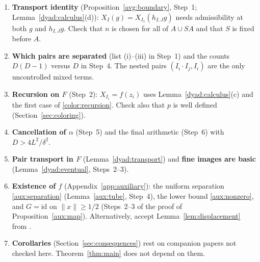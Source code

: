 \documentclass[11pt]{article}
\newcommand{\norm}[1]{\lVert #1\rVert}
\theoremstyle{definition}
\numberwithin{equation}{section}
\begin{document}
\begin{enumerate}
\item \textbf{Transport identity} (Proposition~\ref{avg:boundary}, Step~1;
 Lemma~\ref{dyad:calculus}(d)): $X_I(g)=X_{I_1}(h_{I,J}g)$ needs
 admissibility at both $g$ and $h_{I,J}g$. Check that $n$ is chosen for all
 of $A\cup SA$ and that $S$ is fixed before $A$.
\item \textbf{Which pairs are separated} (list (i)--(iii) in Step~1) and the
 counts $D(D-1)$ versus $D$ in Step~4. The nested pairs
 $(I_i\cdot I_j,I_i)$ are the only uncontrolled mixed terms.
\item \textbf{Recursion on $F$} (Step~2): $X_{I_i}=f(z_i)$ uses
 Lemma~\ref{dyad:calculus}(c) and the first case of
 \eqref{color:recursion}. Check also that $p$ is well defined
 (Section~\ref{sec:coloring}).
\item \textbf{Cancellation of $\alpha$} (Step~5) and the final arithmetic
 (Step~6) with $D>4L^2/\delta^2$.
\item \textbf{Pair transport in $F$} (Lemma~\ref{dyad:transport}) and
 \textbf{fine images are basic} (Lemma~\ref{dyad:eventual}, Steps~2--3).
\item \textbf{Existence of $f$} (Appendix~\ref{app:auxiliary}): the
 uniform separation \eqref{aux:separation} (Lemma~\ref{aux:tube}, Step~4),
 the lower bound \eqref{aux:nonzero}, and $G=\mathrm{id}$ on
 $\norm x\ge1/2$ (Steps~2--3 of the proof of
 Proposition~\ref{aux:map}). Alternatively, accept
 Lemma~\ref{lem:displacement} from \cite{BenyaminiSternfeld1983}.
\item \textbf{Corollaries} (Section~\ref{sec:consequences}) rest on
 companion papers not checked here. Theorem~\ref{thm:main} does not depend
 on them.
\end{enumerate}



\end{document}
